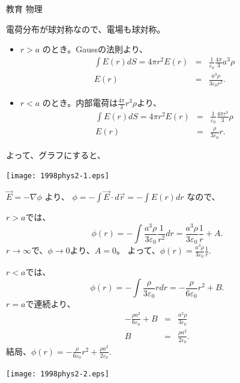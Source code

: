 \documentclass[fleqn]{jbook}
\begin{document}
\begin{answer}{教育 物理}{}
\begin{subanswers}
\begin{subsubanswers}
\end{subsubanswers}

\SubAnswer
\begin{subsubanswers}

\SubSubAnswer
電荷分布が球対称なので、電場も球対称。
\begin{itemize}
\item $r>a$ のとき。Gaussの法則より、
\begin{eqnarray*}
	\int E(r) dS = 4\pi r^{2} E(r) &=& \frac{1}{\varepsilon_{0}}\frac{4\pi}{3}a^{3}\rho \\
	E(r)&=&\frac{a^{3}\rho}{3\varepsilon _{0} r^{2}}.
\end{eqnarray*}
\item $r<a$ のとき。内部電荷は\(\frac{4\pi}{3}r^{3}\rho \)より、
\begin{eqnarray*}
	\int E(r) dS = 4\pi r^{2} E(r) &=& \frac{1}{\varepsilon_{0}}\frac{4\pi r^3}{3}\rho \\
	E(r)&=&\frac{\rho}{3\varepsilon _{0}} r.
\end{eqnarray*}	
\end{itemize}
よって、グラフにすると、\\
\begin{center}
\texttt{[image: 1998phys2-1.eps]}
\end{center}

\SubSubAnswer
$\vec{E}=-\nabla \phi$ より、
$\phi = -\int \vec{E}\cdot d\vec{r}=-\int E(r)dr$
なので、

$r>a$では、
\[
\phi(r)=-\int \frac{a^{3}\rho}{3\varepsilon_{0}}\frac{1}{r^{2}}dr
=\frac{a^{3}\rho}{3\varepsilon_{0}} \frac{1}{r} + A.
\]
$r\rightarrow \infty$で、$\phi\rightarrow 0$より、$A=0$。
よって、$\phi(r)=\frac{a^{3}\rho}{3\varepsilon_{0}} \frac{1}{r}$.

$r<a$では、
\[
\phi(r)=-\int \frac{\rho}{3\varepsilon_{0}}rdr
=-\frac{\rho}{6\varepsilon_{0}}r^{2} + B.
\]
$r=a$で連続より、
\begin{eqnarray*}
-\frac{\rho a^{2}}{6\varepsilon_{0}}+B&=&\frac{a^{2}\rho}{3\varepsilon_{0}}\\
B&=&\frac{\rho a^{2}}{2\varepsilon_{0}}.
\end{eqnarray*}
結局、$\phi(r)=-\frac{\rho}{6\varepsilon_{0}} r^{2}+\frac{\rho a^{2}}{2\varepsilon_{0}}$.\\

\begin{center}
\texttt{[image: 1998phys2-2.eps]}
\end{center}



\end{subsubanswers}
\end{subanswers}
\end{answer}
\end{document}
